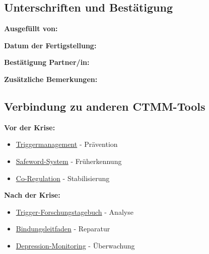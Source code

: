 \subsection{Unterschriften und Bestätigung}

\begin{ctmmOrangeBox}[title=Dokumentation abgeschlossen]

\textbf{Ausgefüllt von:} \\

\textbf{Datum der Fertigstellung:} \\

\textbf{Bestätigung Partner/in:} \\

\textbf{Zusätzliche Bemerkungen:} \\

\end{ctmmOrangeBox}


\subsection{Verbindung zu anderen CTMM-Tools}

\textbf{Vor der Krise:}
\begin{itemize}
    \item \hyperref[sec:triggermanagement]{Triggermanagement} - Prävention
    \item \hyperref[sec:safewords]{Safeword-System} - Früherkennung
    \item \hyperref[sec:co-regulation]{Co-Regulation} - Stabilisierung
\end{itemize}

\textbf{Nach der Krise:}
\begin{itemize}
    \item \hyperref[sec:trigger-forschungstagebuch]{Trigger-Forschungstagebuch} - Analyse
    \item \hyperref[sec:bindung]{Bindungsleitfaden} - Reparatur
    \item \hyperref[sec:depression]{Depression-Monitoring} - Überwachung
\end{itemize}

\newpage
